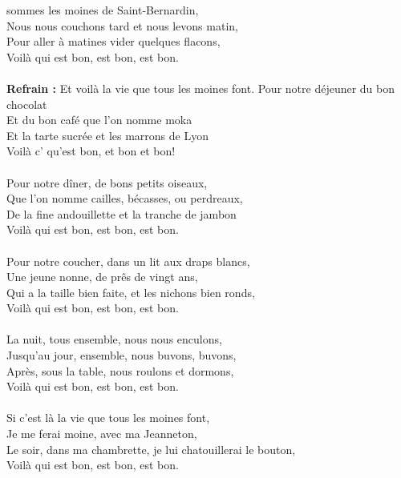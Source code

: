 
 sommes les moines de Saint-Bernardin, \bissimple
\\Nous nous couchons tard et nous levons matin, \bissimple
\\Pour aller à matines vider quelques flacons,
\\Voilà qui est bon, est bon, est bon.
\\\\\textbf{Refrain :}
{Et voilà la vie que tous les moines font.}
Pour notre déjeuner du bon chocolat \bissimple
\\Et du bon café que l'on nomme moka \bissimple
\\Et la tarte sucrée et les marrons de Lyon
\\Voilà c' qu'est bon, et bon et bon!
\\\\Pour notre dîner, de bons petits oiseaux, \bissimple
\\Que l'on nomme cailles, bécasses, ou perdreaux, \bissimple
\\De la fine andouillette et la tranche de jambon
\\Voilà qui est bon, est bon, est bon.
\\\\Pour notre coucher, dans un lit aux draps blancs, \bissimple
\\Une jeune nonne, de prês de vingt ans, \bissimple
\\Qui a la taille bien faite, et les nichons bien ronds,
\\Voilà qui est bon, est bon, est bon.
\\\\La nuit, tous ensemble, nous nous enculons, \bissimple
\\Jusqu'au jour, ensemble, nous buvons, buvons,\bissimple
\\Après, sous la table, nous roulons et dormons,
\\Voilà qui est bon, est bon, est bon.
\\\\Si c'est là la vie que tous les moines font, \bissimple
\\Je me ferai moine, avec ma Jeanneton,\bissimple
\\Le soir, dans ma chambrette, je lui chatouillerai le bouton,
\\Voilà qui est bon, est bon, est bon.

\breakpage
